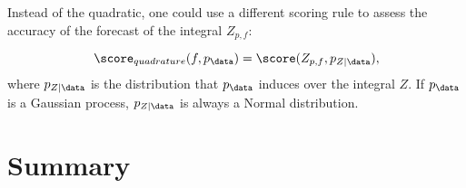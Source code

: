 Instead of the quadratic, one could use a different scoring rule to assess the accuracy of the forecast of the integral  $Z_{p,f}$:

\begin{equation}
	\score_{quadrature}(f,p_\data) = \score(Z_{p,f},p_{Z\vert\data}),
\end{equation}
where $p_{Z\vert\data}$ is the distribution that $p_{\data}$ induces over the integral $Z$. If $p_{\data}$ is a Gaussian process, $p_{Z\vert\data}$ is always a Normal distribution.

\section{Summary}